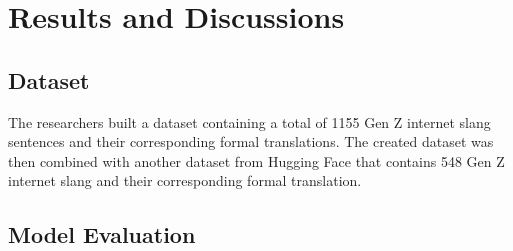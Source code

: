 \chapter{Results and Discussions}
\section{Dataset}
The researchers built a dataset containing a total of 1155 Gen Z internet slang sentences and their corresponding formal translations. The created dataset was then combined with another dataset from Hugging Face that contains 548 Gen Z internet slang and their corresponding formal translation.

\section{Model Evaluation}
